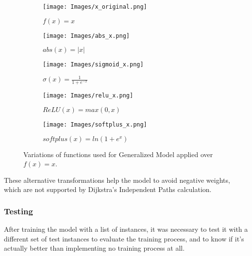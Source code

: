 \begin{figure}[htbp]
    \centering
    \begin{subfigure}[b]{0.3\textwidth}
        \texttt{[image: Images/x\_original.png]}
        \caption{$f(x) = x$}
        \label{fig:x_original}
    \end{subfigure}
    \hspace{0.01\textwidth}
    \begin{subfigure}[b]{0.3\textwidth}
        \texttt{[image: Images/abs\_x.png]}
        \caption{$abs(x) = |x|$}
        \label{fig:abs_x}
    \end{subfigure}
    \hspace{0.01\textwidth}
    \begin{subfigure}[b]{0.3\textwidth}
        \texttt{[image: Images/sigmoid\_x.png]}
        \caption{$\sigma(x) = \frac{1}{1+e^{-x}}$}
        \label{fig:sigmoid_x}
    \end{subfigure}

    \vspace{0.5cm}

    \begin{subfigure}[b]{0.3\textwidth}
        \texttt{[image: Images/relu\_x.png]}
        \caption{$ReLU(x) = max(0, x)$}
        \label{fig:relu_x}
    \end{subfigure}
    \hspace{0.01\textwidth}
    \begin{subfigure}[b]{0.3\textwidth}
        \texttt{[image: Images/softplus\_x.png]}
        \caption{$softplus(x) = ln(1+e^x)$}
        \label{fig:softplus_x}
    \end{subfigure}
    
    \caption{Variations of functions used for Generalized Model applied over $f(x) = x$.}
    \label{fig:GLM}
\end{figure}
These alternative transformations help the model to avoid negative weights, which are not supported by Dijkstra's Independent Paths calculation.

\subsubsection{Testing}

After training the model with a list of instances, it was necessary to test it with a different set of test instances to evaluate the training process, and to know if it's actually better than implementing no training process at all. 

